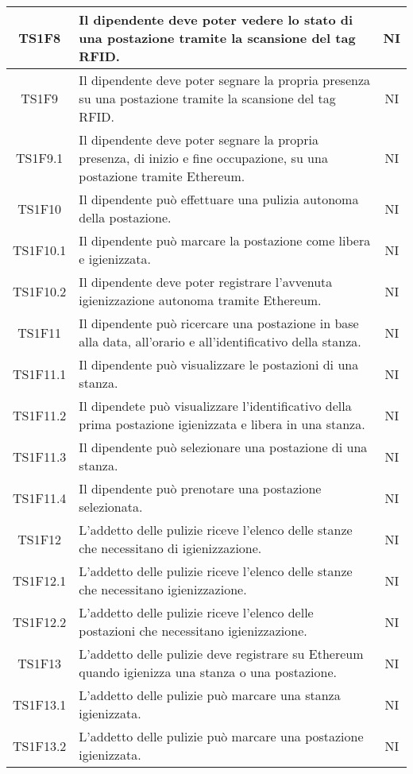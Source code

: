 \begin{center}
\begin{longtable}{|c|p{10cm}|c|}
			\hline
			TS1F8 & Il dipendente deve poter vedere lo stato di una postazione tramite la scansione del tag RFID. & NI \\	
			\hline
			TS1F9 & Il dipendente deve poter segnare la propria presenza su una postazione tramite la scansione del tag RFID. & NI \\	
			\hline
			TS1F9.1 & Il dipendente deve poter segnare la propria presenza, di inizio e fine occupazione, su una postazione tramite Ethereum. & NI \\	
			\hline
			TS1F10 & Il dipendente può effettuare una pulizia autonoma della postazione. & NI \\	
			\hline
			TS1F10.1 & Il dipendente può marcare la postazione come libera e igienizzata. & NI \\	
			\hline
			TS1F10.2 & Il dipendente deve poter registrare l'avvenuta igienizzazione autonoma tramite Ethereum. & NI \\	
			\hline
			TS1F11 & Il dipendente può ricercare una postazione in base alla data, all'orario e all'identificativo della stanza. & NI \\	
			\hline
			TS1F11.1 & Il dipendente può visualizzare le postazioni di una stanza. & NI \\	
			\hline
			TS1F11.2 & Il dipendete può visualizzare l'identificativo della prima postazione igienizzata e libera in una stanza. & NI \\	
			\hline
			TS1F11.3 & Il dipendente può selezionare una postazione di una stanza. & NI \\	
			\hline
			TS1F11.4 & Il dipendente può prenotare una postazione selezionata. & NI \\	
			\hline
			TS1F12 & L'addetto delle pulizie riceve l'elenco delle stanze che necessitano di igienizzazione. & NI \\	
			\hline
			TS1F12.1 & L'addetto delle pulizie riceve l'elenco delle stanze che necessitano igienizzazione. & NI \\	
			\hline
			TS1F12.2 & L'addetto delle pulizie riceve l'elenco delle postazioni che necessitano igienizzazione. & NI \\	
			\hline
			TS1F13 & L'addetto delle pulizie deve registrare su Ethereum quando igienizza una stanza o una postazione. & NI \\	
			\hline
			TS1F13.1 & L'addetto delle pulizie può marcare una stanza igienizzata. & NI \\	
			\hline
			TS1F13.2 & L'addetto delle pulizie può marcare una postazione igienizzata. & NI \\	

\end{longtable}
\end{center}
